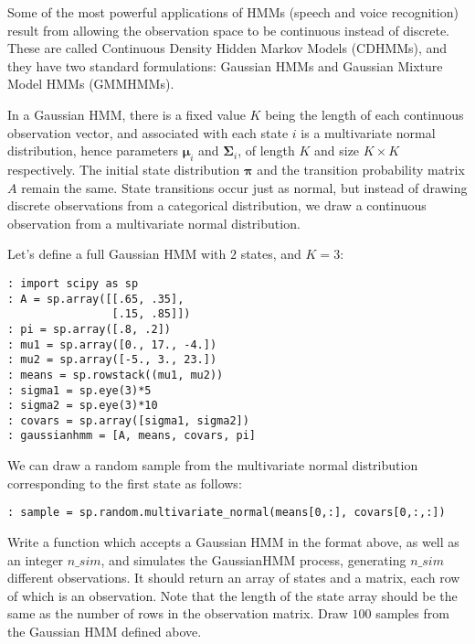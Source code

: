 

Some of the most powerful applications of HMMs (speech and voice recognition) result from allowing the observation space to be continuous instead of discrete.  These are called Continuous Density Hidden Markov Models (CDHMMs), and they have two standard formulations: Gaussian HMMs and Gaussian Mixture Model HMMs (GMMHMMs).

In a Gaussian HMM, there is a fixed value $K$ being the length of each continuous observation vector, and associated with each state $i$ is a multivariate normal distribution, hence parameters $\mathbf{\mu}_{i}$ and $\mathbf{\Sigma}_{i}$, of length $K$ and size $K \times K$ respectively. The initial state distribution $\mathbf{\pi}$ and the transition probability matrix $A$ remain the same. State transitions occur just as normal, but instead of drawing discrete observations from a categorical distribution, we draw a continuous observation from a multivariate normal distribution.

Let's define a full Gaussian HMM with $2$ states, and $K=3$:

\begin{lstlisting}[style=python]
: import scipy as sp
: A = sp.array([[.65, .35],
                [.15, .85]])
: pi = sp.array([.8, .2])
: mu1 = sp.array([0., 17., -4.])
: mu2 = sp.array([-5., 3., 23.])
: means = sp.rowstack((mu1, mu2))
: sigma1 = sp.eye(3)*5
: sigma2 = sp.eye(3)*10
: covars = sp.array([sigma1, sigma2])
: gaussianhmm = [A, means, covars, pi]
\end{lstlisting}

We can draw a random sample from the multivariate normal distribution corresponding to the first state as follows:

\begin{lstlisting}[style=python]
: sample = sp.random.multivariate_normal(means[0,:], covars[0,:,:])
\end{lstlisting}

\begin{problem}
Write a function which accepts a Gaussian HMM in the format above, as well as an integer $n\_sim$, and simulates the GaussianHMM process, generating $n\_sim$ different observations. It should return an array of states and a matrix, each row of which is an observation. Note that the length of the state array should be the same as the number of rows in the observation matrix. Draw $100$ samples from the Gaussian HMM defined above.
\end{problem}

